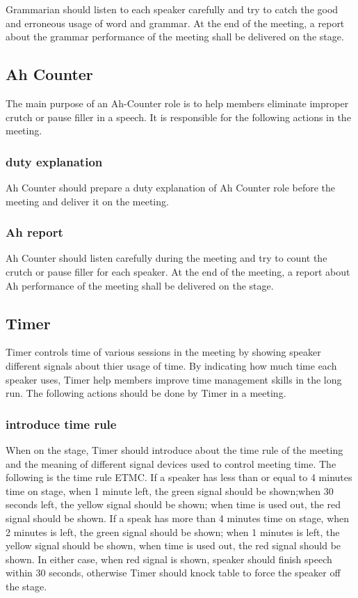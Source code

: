 Grammarian should listen to each speaker carefully and try to catch the good and erroneous 
usage of word and grammar. At the end of the meeting, a report about the grammar performance
of the meeting shall be delivered on the stage.

\subsection{Ah Counter}

The main purpose of an Ah-Counter role is to help members eliminate improper crutch or pause 
filler in a speech. It is responsible for the following actions in the meeting.

\subsubsection{duty explanation}
Ah Counter should prepare a duty explanation of Ah Counter role before the meeting and 
deliver it on the meeting.

\subsubsection{Ah report}
Ah Counter should listen carefully during the meeting and try to count the crutch or 
pause filler for each speaker. At the end of the meeting, a report about Ah 
performance of the meeting shall be delivered on the stage.

\subsection{Timer}
Timer controls time of various sessions in the meeting by showing speaker different 
signals about thier usage of time. By indicating how much time each speaker uses, 
Timer help members improve time management skills in the long run. The following 
actions should be done by Timer in a meeting.

\subsubsection{introduce time rule}
When on the stage, Timer should introduce about the time rule of the meeting and 
the meaning of different signal devices used to control meeting time. The following
is the time rule ETMC. If a speaker has less than or equal to 4 minutes time on stage, 
when 1 minute left, the green signal should be shown;when 30 seconds left, the yellow
signal should be shown; when time is used out, the red signal should be shown. If a 
speak has more than 4 minutes time on stage, when 2 minutes is left, the green signal
should be shown; when 1 minutes is left, the yellow signal should be shown, when time
is used out, the red signal should be shown. In either case, when red signal is shown,
speaker should finish speech within 30 seconds, otherwise Timer should knock table to
force the speaker off the stage.

